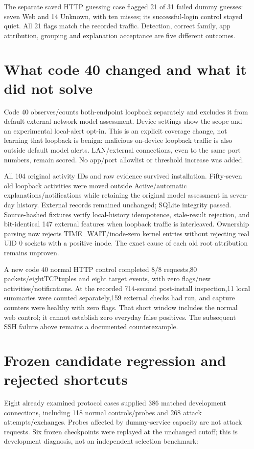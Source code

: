 \documentclass[11pt,a4paper,oneside]{report}
\begin{document}
The separate saved HTTP guessing case flagged 21 of 31 failed dummy guesses: seven Web and 14 Unknown, with ten misses; its successful-login control stayed quiet. All 21 flags match the recorded traffic. Detection, correct family, app attribution, grouping and explanation acceptance are five different outcomes.

\section{What code 40 changed and what it did not solve}
Code 40 observes/counts both-endpoint loopback separately and excludes it from default external-network model assessment. Device settings show the scope and an experimental local-alert opt-in. This is an explicit coverage change, not learning that loopback is benign: malicious on-device loopback traffic is also outside default model alerts. LAN/external connections, even to the same port numbers, remain scored. No app/port allowlist or threshold increase was added.

All 104 original activity IDs and raw evidence survived installation. Fifty-seven old loopback activities were moved outside Active/automatic explanations/notifications while retaining the original model assessment in seven-day history. External records remained unchanged; SQLite integrity passed. Source-hashed fixtures verify local-history idempotence, stale-result rejection, and bit-identical 147 external features when loopback traffic is interleaved. Ownership parsing now rejects TIME\_WAIT/inode-zero kernel entries without rejecting real UID 0 sockets with a positive inode. The exact cause of each old root attribution remains unproven.

A new code 40 normal HTTP control completed 8/8 requests,80 packets/eightTCPtuples and eight target events, with zero flags/new activities/notifications. At the recorded 714-second post-install inspection,11 local summaries were counted separately,159 external checks had run, and capture counters were healthy with zero flags. That short window includes the normal web control; it cannot establish zero everyday false positives. The subsequent SSH failure above remains a documented counterexample.

\section{Frozen candidate regression and rejected shortcuts}
Eight already examined protocol cases supplied 386 matched development connections, including 118 normal controls/probes and 268 attack attempts/exchanges. Probes affected by dummy-service capacity are not attack requests. Six frozen checkpoints were replayed at the unchanged cutoff; this is development diagnosis, not an independent selection benchmark:
\end{document}
